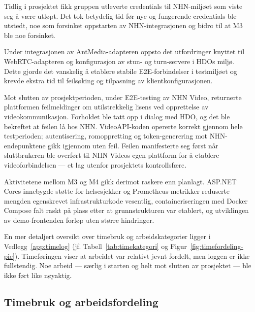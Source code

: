 Tidlig i prosjektet fikk gruppen utleverte credentials til NHN-miljøet som viste
seg å være utløpt. Det tok betydelig tid før nye og fungerende credentials ble
utstedt, noe som forsinket oppstarten av NHN-integrasjonen og bidro til at M3
ble noe forsinket.

Under integrasjonen av AntMedia-adapteren oppsto det utfordringer knyttet til
WebRTC-adapteren og konfigurasjon av \gls{stun}- og \gls{turn}-servere i HDOs miljø. Dette
gjorde det vanskelig å etablere stabile E2E-forbindelser i testmiljøet
og krevde ekstra tid til feilsøking og tilpasning av klientkonfigurasjonen.

Mot slutten av prosjektperioden, under E2E-testing av NHN Video,
returnerte plattformen feilmeldinger om utilstrekkelig lisens ved opprettelse av
videokommunikasjon. Forholdet ble tatt opp i dialog med HDO, og det ble bekreftet
at feilen lå hos NHN. VideoAPI-koden opererte korrekt gjennom hele testperioden;
autentisering, romoppretting og token-generering mot NHN-endepunktene gikk
igjennom uten feil. Feilen manifesterte seg først når sluttbrukeren ble overført
til NHN Videos egen plattform for å etablere videoforbindelsen — et lag utenfor
prosjektets kontrollsfære.

Aktivitetene mellom M3 og M4 gikk derimot raskere enn planlagt. ASP.NET Cores
innebygde støtte for helsesjekker og Prometheus-metrikker reduserte mengden
egenskrevet infrastrukturkode vesentlig, containeriseringen med Docker Compose
falt raskt på plass etter at grunnstrukturen var etablert, og utviklingen av
demo-frontenden forløp uten større hindringer.


En mer detaljert oversikt over timebruk og arbeidskategorier ligger i Vedlegg~\ref{app:timelog} (jf. Tabell~\ref{tab:timekategori} og Figur~\ref{fig:timefordeling-pie}). Timeføringen viser at arbeidet var relativt jevnt fordelt, men loggen er ikke fullstendig. Noe arbeid — særlig i starten og helt mot slutten av prosjektet — ble ikke ført like nøyaktig.

\subsection{Timebruk og arbeidsfordeling}

